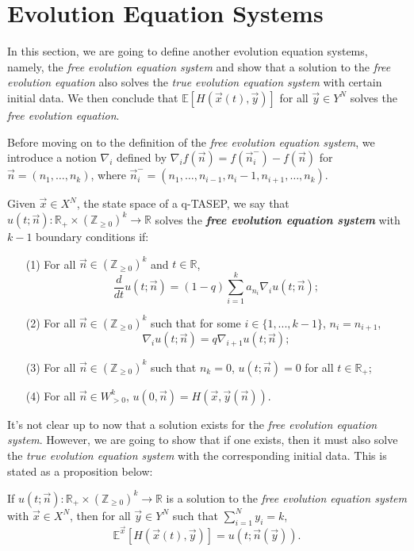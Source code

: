 \section{Evolution Equation Systems}
\label{evolution-equation-system}
In this section, we are going to define another evolution equation systems, namely, the \emph{free evolution equation system} and show that a solution to the \emph{free evolution equation} also solves the \emph{true evolution equation system} with certain initial data. We then conclude that $\mathbb{E}[H(\vec{x}(t),\vec{y})]$ for all $\vec{y} \in Y^N$ solves the \emph{free evolution equation}.

Before moving on to the definition of the \emph{free evolution equation system}, we introduce a notion $\nabla_i$ defined by $\nabla_i f(\vec{n}) = f(\vec{n}_i^-) - f(\vec{n})$ for $\vec{n} = (n_1, \dots, n_k)$, where $\vec{n}_i^- = (n_1,\dots,n_{i-1}, n_i - 1, n_{i+1}, \dots, n_k)$.

\begin{definition}
\label{def:free-evolution-equation}
Given $\vec{x} \in X^N$, the state space of a q-TASEP, we say that $u(t;\vec{n}):\mathbb{R}_+ \times (\mathbb{Z}_{\ge 0})^k \rightarrow \mathbb{R}$ solves the \textbf{\emph{free evolution equation system}} with $k-1$ boundary conditions if:
\begin{enumerate}
\item[(1)] For all $\vec{n} \in (\mathbb{Z}_{\ge 0})^k$ and $t \in \mathbb{R}$, $$\frac{d}{dt} u(t;\vec{n}) = (1-q) \sum_{i=1}^{k} a_{n_i} \nabla_i u(t;\vec{n});$$
\item[(2)] For all $\vec{n} \in (\mathbb{Z}_{\ge 0})^k$ such that for some $i \in \{1,...,k-1\}$, $n_i = n_{i+1}$, $$\nabla_i u(t;\vec{n}) = q \nabla_{i+1} u(t;\vec{n});$$
\item[(3)] For all $\vec{n} \in (\mathbb{Z}_{\ge 0})^k$ such that $n_k = 0$, $u(t;\vec{n}) = 0$ for all $t \in \mathbb{R}_+$;
\item[(4)] For all $\vec{n} \in W^k_{>0}$, $u(0,\vec{n}) = H(\vec{x},\vec{y}(\vec{n}))$. 
\end{enumerate}
\end{definition}

It's not clear up to now that a solution exists for the \emph{free evolution equation system}. However, we are going to show that if one exists, then it must also solve the \emph{true evolution equation system} with the corresponding initial data. This is stated as a proposition below:

\begin{proposition}
\label{free-to-true-evolution}
If $u(t;\vec{n}):\mathbb{R}_+ \times (\mathbb{Z}_{\ge 0})^k \rightarrow \mathbb{R}$ is a solution to the \emph{free evolution equation system} with $\vec{x} \in X^N$, then for all $\vec{y} \in Y^N$ such that $\sum_{i=1}^{N} y_i = k$, $$\mathbb{E}^{\vec{x}}[H(\vec{x}(t), \vec{y})] = u(t;\vec{n}(\vec{y})).$$
\end{proposition}

